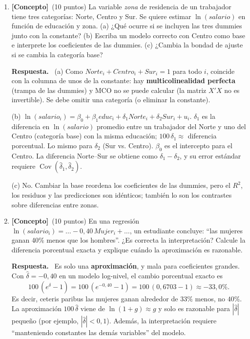 \documentclass[12pt,letterpaper]{article}
\DeclareMathOperator{\cov}{Cov}
\newenvironment{resp}{\begingroup\color{blue}\par\noindent\textbf{Respuesta.}\ }{\par\endgroup}
\newcommand{\conc}{\textbf{[Concepto]}}
\begin{document}
\begin{enumerate}[1.]

\item \conc\ (10 puntos) La variable \emph{zona} de residencia de un trabajador tiene tres categorías: Norte, Centro y Sur. Se quiere estimar $\ln(salario)$ en función de educación y zona. (a) ¿Qué ocurre si se incluyen las tres dummies junto con la constante? (b) Escriba un modelo correcto con Centro como base e interprete los coeficientes de las dummies. (c) ¿Cambia la bondad de ajuste si se cambia la categoría base?

\begin{resp}
(a) Como $Norte_i+Centro_i+Sur_i=1$ para todo $i$, coincide con la columna de unos de la constante: hay \textbf{multicolinealidad perfecta} (trampa de las dummies) y MCO no se puede calcular (la matriz $X'X$ no es invertible). Se debe omitir una categoría (o eliminar la constante).

(b) $\ln(salario_i)=\beta_0+\beta_1educ_i+\delta_1Norte_i+\delta_2Sur_i+u_i$. $\delta_1$ es la diferencia en $\ln(salario)$ promedio entre un trabajador del Norte y uno del Centro (categoría base) con la misma educación; $100\,\delta_1\approx$ diferencia porcentual. Lo mismo para $\delta_2$ (Sur vs. Centro). $\beta_0$ es el intercepto para el Centro. La diferencia Norte–Sur se obtiene como $\delta_1-\delta_2$, y su error estándar requiere $\cov(\hat\delta_1,\hat\delta_2)$.

(c) No. Cambiar la base reordena los coeficientes de las dummies, pero el $R^2$, los residuos y las predicciones son idénticos; también lo son los contrastes sobre diferencias entre zonas.
\end{resp}

\item \conc\ (10 puntos) En una regresión $\ln(salario_i)=\ldots-0{,}40\,Mujer_i+\ldots$, un estudiante concluye: ``las mujeres ganan 40\% menos que los hombres''. ¿Es correcta la interpretación? Calcule la diferencia porcentual exacta y explique cuándo la aproximación es razonable.

\begin{resp}
Es solo una \textbf{aproximación}, y mala para coeficientes grandes. Con $\hat\delta=-0{,}40$ en un modelo log-nivel, el cambio porcentual exacto es
\[
100\,(e^{\hat\delta}-1)=100\,(e^{-0{,}40}-1)=100\,(0{,}6703-1)\approx-33{,}0\%.
\]
Es decir, ceteris paribus las mujeres ganan alrededor de $33\%$ menos, no $40\%$. La aproximación $100\,\hat\delta$ viene de $\ln(1+g)\approx g$ y solo es razonable para $|\hat\delta|$ pequeño (por ejemplo, $|\hat\delta|<0{,}1$). Además, la interpretación requiere ``manteniendo constantes las demás variables'' del modelo.
\end{resp}


\end{enumerate}
\end{document}
